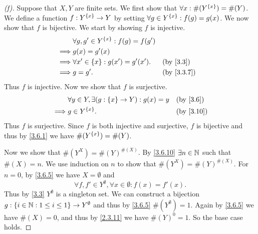 \begin{proof}[(f)]
	Suppose that \(X, Y\) are finite sets.
	We first show that \(\forall x : \#(Y^{\left\lbrace x\right\rbrace}) = \#(Y)\).
	We define a function \(f : Y^{\left\lbrace x\right\rbrace} \to Y\) by setting \(\forall g \in Y^{\left\lbrace x\right\rbrace} : f(g) = g(x)\).
	We now show that \(f\) is bijective.
	We start by showing \(f\) is injective.
	\begin{align*}
		         & \forall g, g' \in Y^{\set{x}} : f(g) = f(g')                 \\
		\implies & g(x) = g'(x)                                                 \\
		\implies & \forall x' \in \set{x} : g(x') = g'(x').     &  & \by{3.3}   \\
		\implies & g = g'.                                      &  & \by{3.3.7}
	\end{align*}
	Thus \(f\) is injective.
	Now we show that \(f\) is surjective.
	\begin{align*}
		         & \forall y \in Y, \exists (g : \set{x} \to Y) : g(x) = y &  & \by{3.6}  \\
		\implies & g \in Y^{\set{x}}.                                      &  & \by{3.10}
	\end{align*}
	Thus \(f\) is surjective.
	Since \(f\) is both injective and surjective, \(f\) is bijective and thus by \cref{3.6.1} we have \(\#(Y^{\left\lbrace x\right\rbrace}) = \#(Y)\).

	Now we show that \(\#(Y^X) = \#(Y)^{\#(X)}\).
	By \cref{3.6.10} \(\exists n \in \mathbb{N}\) such that \(\#(X) = n\).
	We use induction on \(n\) to show that \(\#(Y^X) = \#(Y)^{\#(X)}\).
	For \(n = 0\), by \cref{3.6.5} we have \(X = \emptyset\) and
	\[
		\forall f, f' \in Y^\emptyset, \forall x \in \emptyset : f(x) = f'(x).
	\]
	Thus by \cref{3.3} \(Y^\emptyset\) is a singleton set.
	We can construct a bijection \(g : \left\lbrace i \in \mathbb{N} : 1 \leq i \leq 1\right\rbrace \to Y^\emptyset\) and thus by \cref{3.6.5} \(\#(Y^\emptyset) = 1\).
	Again by \cref{3.6.5} we have \(\#(X) = 0\), and thus by \cref{2.3.11} we have \(\#(Y)^0 = 1\).
	So the base case holds.


\end{proof}
